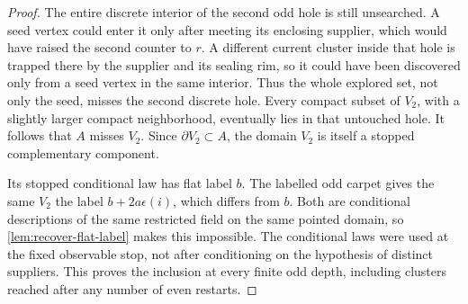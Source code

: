 \begin{proof}
The entire discrete interior of the second odd hole is still
unsearched. A seed vertex could enter it only after meeting its
enclosing supplier, which would have raised the second counter to
\(r\). A different current cluster inside that hole is trapped there
by the supplier and its sealing rim, so it could have been discovered
only from a seed vertex in the same interior. Thus the whole explored
set, not only the seed, misses the second discrete hole. Every compact
subset of \(V_2\), with a slightly larger compact neighborhood,
eventually lies in that untouched hole. It follows that \(A\) misses
\(V_2\). Since \(\partial V_2\subset A\), the domain \(V_2\) is
itself a stopped complementary component.

Its stopped conditional law has flat label \(b\). The labelled odd
carpet gives the same \(V_2\) the label \(b+2a\epsilon(i)\), which
differs from \(b\). Both are conditional descriptions of the same
restricted field on the same pointed domain, so
\cref{lem:recover-flat-label} makes this impossible. The conditional
laws were used at the fixed observable stop, not after conditioning
on the hypothesis of distinct suppliers. This proves the inclusion
at every finite odd depth, including clusters reached after any
number of even restarts.


\end{proof}
